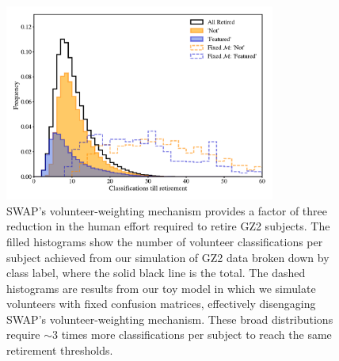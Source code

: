 \documentclass[twocolumn]{aastex6}%
\begin{document}
\begin{figure}[t!] 
\centering
\includegraphics[width=3.5in]{f4.pdf}
\caption{
{SWAP's volunteer-weighting mechanism provides a factor of three reduction in the human effort required to retire GZ2 subjects. The filled histograms show the number of volunteer classifications per subject achieved from our simulation of GZ2 data broken down by class label, where the solid black line is the total. The dashed histograms are results from our toy model in which we simulate volunteers with fixed confusion matrices, effectively disengaging SWAP's volunteer-weighting mechanism. These broad distributions require $\sim$3 times more classifications per subject to reach the same retirement thresholds.}  } \label{fig: swap vote distributions}
\end{figure}
\end{document}
